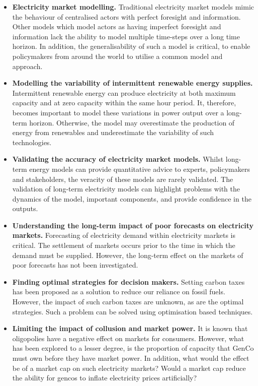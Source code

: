 \begin{itemize}
	
	
	\item \textbf{Electricity market modelling.} Traditional electricity market models mimic the behaviour of centralised actors with perfect foresight and information. Other models which model actors as having imperfect foresight and information lack the ability to model multiple time-steps over a long time horizon. In addition, the generalisability of such a model is critical, to enable policymakers from around the world to utilise a common model and approach.
	
	\item \textbf{Modelling the variability of intermittent renewable energy supplies.} Intermittent renewable energy can produce electricity at both maximum capacity and at zero capacity within the same hour period. It, therefore, becomes important to model these variations in power output over a long-term horizon. Otherwise, the model may overestimate the production of energy from renewables and underestimate the variability of such technologies.
	
	\item \textbf{Validating the accuracy of electricity market models.} Whilst long-term energy models can provide quantitative advice to experts, policymakers and stakeholders, the veracity of these models are rarely validated. The validation of long-term electricity models can highlight problems with the dynamics of the model, important components, and provide confidence in the outputs. 
	
	
	\item \textbf{Understanding the long-term impact of poor forecasts on electricity markets.} Forecasting of electricity demand within electricity markets is critical. The settlement of markets occurs prior to the time in which the demand must be supplied. However, the long-term effect on the markets of poor forecasts has not been investigated.
	
	\item \textbf{Finding optimal strategies for decision makers.} Setting carbon taxes has been proposed as a solution to reduce our reliance on fossil fuels. However, the impact of such carbon taxes are unknown, as are the optimal strategies. Such a problem can be solved using optimisation based techniques.
	
	\item \textbf{Limiting the impact of collusion and market power.} It is known that oligopolies have a negative effect on markets for consumers. However, what has been explored to a lesser degree, is the proportion of capacity that \gls{GenCo} must own before they have market power. In addition, what would the effect be of a market cap on such electricity markets? Would a market cap reduce the ability for \acrfull{gencos} to inflate electricity prices artificially?
	
\end{itemize}

